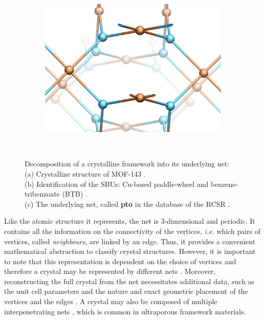 \documentclass[main.tex]{subfiles}
\begin{document}
\begin{figure}[p]
\begin{subfigure}[t]{0.5\linewidth}
		\includegraphics[width=\linewidth]{figures/topology/mof14_3.jpg}
		\subcaption{}
	\end{subfigure}\\[5mm]
	\caption{Decomposition of a crystalline framework into its underlying net:\\
		(a) Crystalline structure of MOF-143 \autocite{MOF143}.\\
		(b) Identification of the SBUs: Cu-based paddle-wheel \autocite{ReverseTopologicalApproach} and benzene-tribenzoate (BTB) \autocite{BTB}.\\
		(c) The underlying net, called \textbf{pto} in the database of the RCSR \autocite{RCSR}.} \label{fig:mof}
\end{figure}

Like the atomic structure it represents, the net is 3-dimensional and periodic. It contains all the information on the connectivity of the vertices, \textit{i.e.} which pairs of vertices, called \emph{neighbours}, are linked by an edge. Thus, it provides a convenient mathematical abstraction to classify crystal structures. However, it is important to note that this representation is dependent on the choice of vertices and therefore a crystal may be represented by different nets \autocite{OKeeffe}. Moreover, reconstructing the full crystal from the net necessitates additional data, such as the unit cell parameters and the nature and exact geometric placement of the vertices and the edges \autocite{ReverseTopologicalApproach}. A crystal may also be composed of multiple interpenetrating nets \autocite{interpenetration}, which is common in ultraporous framework materials.
\end{document}
